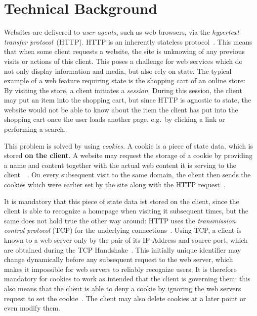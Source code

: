 \section{Technical Background}\label{section:technical-background}
Websites are delivered to \textit{user agents}, such as web browsers, via the \textit{hypertext transfer protocol}~(HTTP).
HTTP is an inherently stateless protocol~\cite{RFC2616}. This means that when some client requests a website, the site is unknowing of any previous visits or actions of this client.
This poses a challenge for web services which do not only display information and media, but also rely on state.
The typical example of a web feature requiring state is the shopping cart of an online store:
By visiting the store, a client initiates a \textit{session}. During this session, the client may put an item into the shopping cart,
but since HTTP is agnostic to state, the website would not be able to know about the item the client has put into the shopping cart once the user loads another page,
e.g.\ by clicking a link or performing a search.\par
This problem is solved by using \textit{cookies}. A cookie is a piece of state data, which is stored \textbf{on the client}.
A website may request the storage of a cookie by providing a name and content together with the actual web content it is serving to the client~~\cite{RFC6265}.
On every subsequent visit to the same domain, the client then sends the cookies which were earlier set by the site along with the HTTP request~\cite[Section~3]{RFC6265}.

It is mandatory that this piece of state data ist stored on the client, since the client is able to recognize a homepage when visiting it subsequent times,
but the same does not hold true the other way around:
HTTP uses the \textit{transmission control protocol} (TCP) for the underlying connections~\cite[Page~13]{RFC2616}. Using TCP, a client is
known to a web server only by the pair of its IP-Address and source port, which are obtained during the TCP Handshake~\cite[Section~2.7]{RFC0793}.
This initially unique identifier may change dynamically before any subsequent request to the web server, which makes it impossible for web servers to reliably recognize users.
It is therefore mandatory for cookies to work as intended that the client is governing them;
this also means that the client is able to deny a cookie by ignoring the web servers request to set the cookie~\cite[Section~5.2]{RFC6265}.
The client may also delete cookies at a later point or even modify them.
